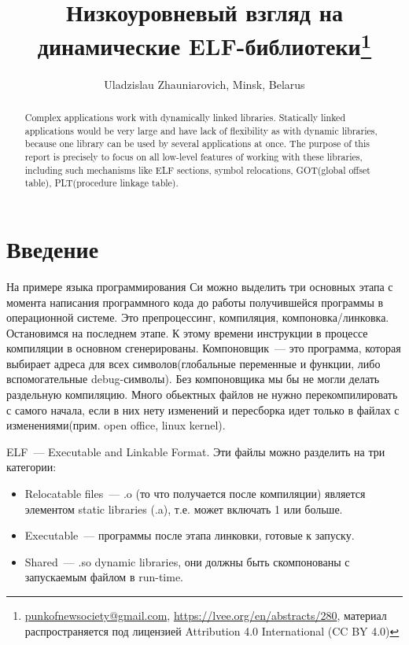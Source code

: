 \documentclass[10pt, a5paper]{article}
\begin{document}
\title{Низкоуровневый взгляд на динамические ELF-библиотеки\footnote{\url{punkofnewsociety@gmail.com}, \url{https://lvee.org/en/abstracts/280}, материал распространяется под лицензией Attribution 4.0 International (CC BY 4.0)}}
\author{Uladzislau Zhauniarovich, Minsk, Belarus}
\maketitle
\begin{abstract}
Complex applications work with dynamically linked libraries. Statically linked applications would be very large and have lack of flexibility as with dynamic libraries, because one library can be used by several applications at once.
The purpose of this report is precisely to focus on all low-level features of working with these libraries, including such mechanisms like 
ELF sections, symbol relocations, GOT(global offset table), PLT(procedure linkage table).
\end{abstract}
\section*{Введение}

На примере языка программирования Си можно выделить три основных этапа с момента написания программного кода до работы получившейся программы в операционной системе. 
Это препроцессинг, компиляция, компоновка/линковка. Остановимся на последнем этапе. К этому времени инструкции в процессе компиляции в  основном сгенерированы.  Компоновщик~--- это программа, которая выбирает адреса для всех символов(глобальные переменные и функции, либо вспомогательные debug-символы). Без компоновщика мы бы не могли делать раздельную компиляцию. Много обьектных файлов не нужно перекомпилировать с самого начала, если в них нету изменений и пересборка идет только в файлах с изменениями(прим. open office, linux kernel).

ELF~--- Executable and Linkable Format. Эти файлы можно разделить на три категории:

\begin{itemize}
  \item Relocatable files~--- .o (то что получается после компиляции) является элементом static libraries (.a), т.е. может включать 1 или больше.
  \item Executable~--- программы после этапа линковки, готовые к запуску.
  \item Shared~--- .so dynamic libraries, они должны быть скомпонованы с запускаемым файлом в run-time.
\end{itemize}
\end{document}
